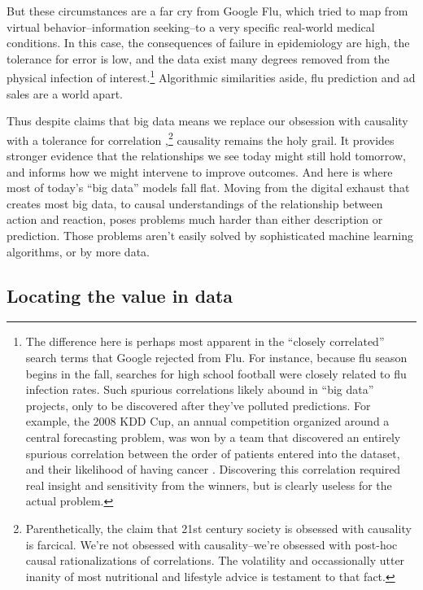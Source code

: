 \documentclass[12pt]{article}
\begin{document}
But these circumstances are a far cry from Google Flu, which tried to
map from virtual behavior--information seeking--to a very specific
real-world medical conditions. In this case, the consequences of failure in
epidemiology are high, the tolerance for error is low, and the data
exist many degrees removed from the physical infection
of interest.\footnote{The difference here is
perhaps most apparent in the ``closely correlated'' search terms that
Google rejected from Flu. For instance, because flu season begins in
the fall, searches for high school football were closely related to
flu infection rates. Such spurious correlations likely abound in ``big
data'' projects, only to be discovered after they've polluted
predictions. For example, the 2008 KDD Cup, an annual competition organized around a
central forecasting problem, was won by a team that discovered an
entirely spurious correlation between the order of patients entered
into the dataset, and their likelihood of having cancer
\citep{perlich2008breast}. Discovering this correlation required real
insight and sensitivity from the winners, but is clearly useless for
the actual problem.} Algorithmic similarities aside, flu prediction
and ad sales are a world apart.

Thus despite claims that big data means we replace our obsession
with causality with a tolerance for correlation
\citep{mayer2013big},\footnote{Parenthetically, the claim that 21st
  century society is obsessed with causality is farcical. We're not
  obsessed with causality--we're obsessed with post-hoc
  causal rationalizations of correlations. The volatility and
  occassionally utter inanity of most nutritional and
lifestyle advice is testament to that fact.} causality remains the holy
grail. It provides stronger evidence that the relationships we see
today might still hold tomorrow, and informs how we might intervene to
improve outcomes. And here is where most of today's ``big data'' models fall
flat. Moving from the digital exhaust that creates most big data, to
causal understandings of the relationship between action and reaction,
poses problems much harder than either description or
prediction. Those problems aren't easily solved by sophisticated
machine learning algorithms, or by more data. 

\subsection{Locating the value in data}
\label{sec:locating-value-data}
\end{document}
